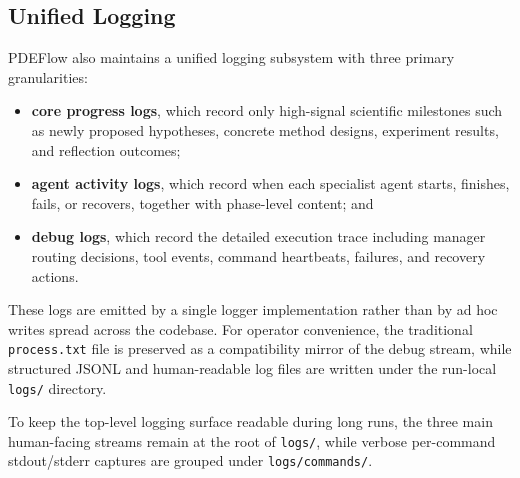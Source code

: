 \documentclass[11pt]{article}
\begin{document}
\subsection{Unified Logging}
PDEFlow also maintains a unified logging subsystem with three primary granularities:
\begin{itemize}[leftmargin=1.5em]
  \item \textbf{core progress logs}, which record only high-signal scientific milestones such as newly proposed hypotheses, concrete method designs, experiment results, and reflection outcomes;
  \item \textbf{agent activity logs}, which record when each specialist agent starts, finishes, fails, or recovers, together with phase-level content; and
  \item \textbf{debug logs}, which record the detailed execution trace including manager routing decisions, tool events, command heartbeats, failures, and recovery actions.
\end{itemize}

These logs are emitted by a single logger implementation rather than by ad hoc writes spread across the codebase. For operator convenience, the traditional \texttt{process.txt} file is preserved as a compatibility mirror of the debug stream, while structured JSONL and human-readable log files are written under the run-local \texttt{logs/} directory.

To keep the top-level logging surface readable during long runs, the three main human-facing streams remain at the root of \texttt{logs/}, while verbose per-command stdout/stderr captures are grouped under \texttt{logs/commands/}.
\end{document}
